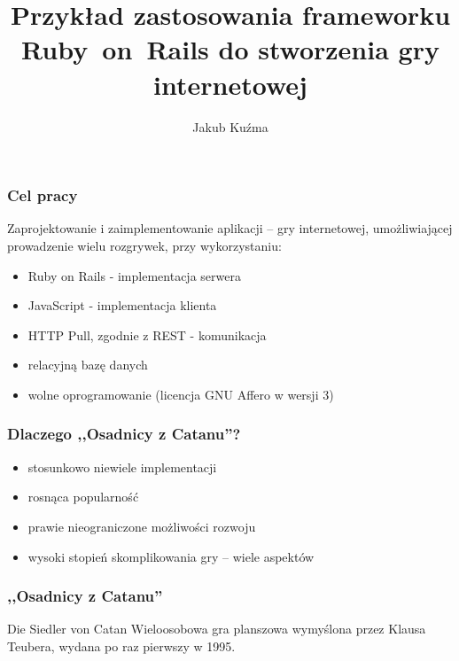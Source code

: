 \documentclass[12pt]{beamer}
\author{Jakub Kuźma}
\title{Przykład zastosowania frameworku Ruby~on~Rails do stworzenia
  gry internetowej}
\begin{document}
\frame{\titlepage}

\begin{frame}
  \frametitle{Cel pracy} Zaprojektowanie i zaimplementowanie aplikacji
  -- gry internetowej, umożliwiającej prowadzenie wielu rozgrywek,
  przy wykorzystaniu:
  \begin{itemize}
  \item Ruby on Rails - implementacja serwera
  \item JavaScript - implementacja klienta
  \item HTTP Pull, zgodnie z REST - komunikacja
  \item relacyjną bazę danych
  \item wolne oprogramowanie (licencja GNU Affero w wersji 3)
  \end{itemize}
\end{frame}

\begin{frame}
  \frametitle{Dlaczego ,,Osadnicy z Catanu''?}
  \begin{itemize}
  \item stosunkowo niewiele implementacji
  \item rosnąca popularność
  \item prawie nieograniczone możliwości rozwoju
  \item wysoki stopień skomplikowania gry -- wiele aspektów
  \end{itemize}
\end{frame}

\begin{frame}
  \frametitle{,,Osadnicy z Catanu''}
  \begin{block}{Die Siedler von Catan}
    Wieloosobowa gra planszowa wymyślona przez Klausa Teubera, wydana
    po raz pierwszy w 1995.
  \end{block}
\end{frame}
\end{document}
